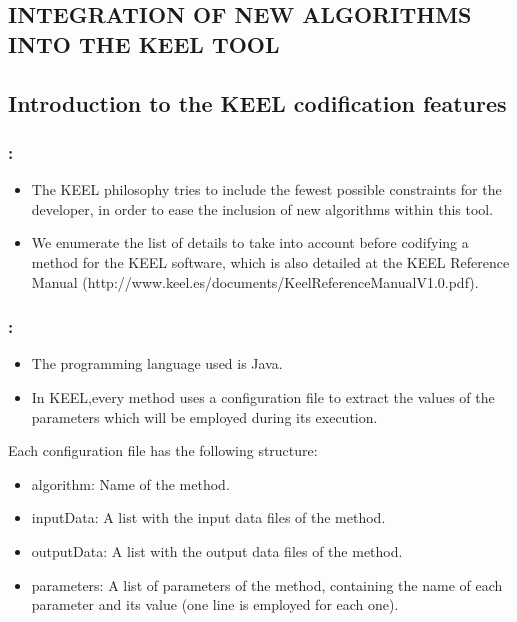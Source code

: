 \documentclass{beamer}
\begin{document}
\begin{CJK*}{UTF8}{bsmi}
\section{INTEGRATION OF NEW ALGORITHMS INTO THE KEEL TOOL} 
\subsection{Introduction to the KEEL codification features}


\begin{frame}
	\frametitle{\insertsection : \insertsubsection}
	

		\begin{itemize}
			\item The KEEL philosophy tries to include the fewest possible constraints for the developer, in order to ease the inclusion of new algorithms within this tool.
			\item We enumerate the list of details to take into account before codifying a method for the KEEL software, which is also detailed at the KEEL Reference Manual (http://www.keel.es/documents/KeelReferenceManualV1.0.pdf).
		\end{itemize}

\end{frame}



\begin{frame}
	\frametitle{\insertsection : \insertsubsection}
	
	
	\begin{itemize}
		\item The programming language used is Java.
		\item In KEEL,every method uses a configuration file to extract the values of the parameters which will be employed during its execution.
	\end{itemize}
		\begin{block}{Each configuration file has the following structure: }
			\begin{itemize}
				\item algorithm: Name of the method.
				\item inputData: A list with the input data files of the method.
				\item outputData: A list with the output data files of the method.
				\item parameters: A list of parameters of the method, containing the name of each parameter and its value (one line is employed for each one).
			\end{itemize}
		\end{block}
	

\end{frame}
\end{CJK*}
\end{document}
